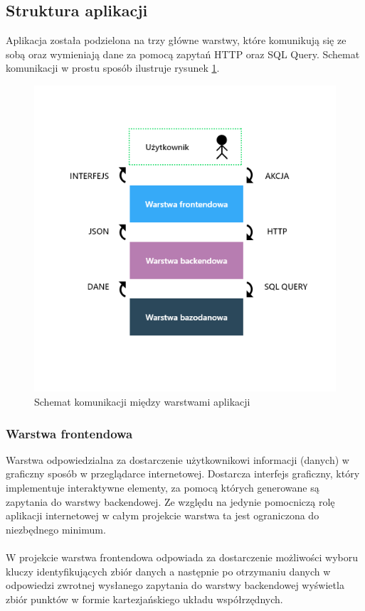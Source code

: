 \documentclass[eng,printmode]{mgr}
\begin{document}
\subsection{Struktura aplikacji}
Aplikacja została podzielona na trzy główne warstwy, które komunikują się ze sobą oraz wymieniają dane za pomocą zapytań HTTP oraz SQL Query. Schemat komunikacji w prostu sposób ilustruje rysunek \ref{fig:layers}.
\\
\begin{figure}[H]
  \begin{center}
  \includegraphics[scale=0.7]{layers}
  \end{center}
  \caption{Schemat komunikacji między warstwami aplikacji}
  \label{fig:layers}
\end{figure}
\subsubsection{Warstwa frontendowa}
Warstwa odpowiedzialna za dostarczenie użytkownikowi informacji (danych) w graficzny sposób w przeglądarce internetowej. Dostarcza interfejs graficzny, który implementuje interaktywne elementy, za pomocą których generowane są zapytania do warstwy backendowej. Ze względu na jedynie pomocniczą rolę aplikacji internetowej w całym projekcie warstwa ta jest ograniczona do niezbędnego minimum.
\\\\
W projekcie warstwa frontendowa odpowiada za dostarczenie możliwości wyboru  kluczy identyfikujących zbiór danych a następnie po otrzymaniu danych w odpowiedzi zwrotnej wysłanego zapytania do warstwy backendowej wyświetla zbiór punktów w formie kartezjańskiego układu współrzędnych.
\end{document}
